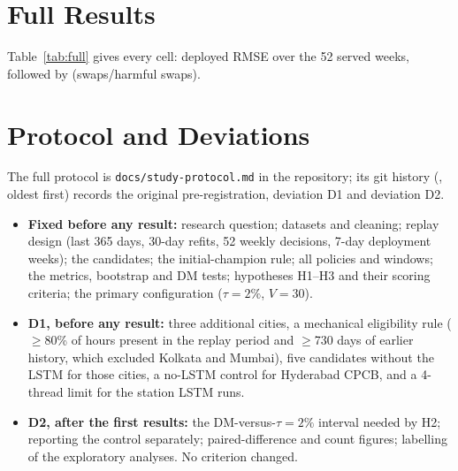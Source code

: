\documentclass[conference]{IEEEtran}
\newif\ifextended
\begin{document}
\ifextended
\appendices

\section{Full Results}
\label{app:full}
Table~\ref{tab:full} gives every cell: deployed RMSE over the 52 served weeks, followed by
(swaps/harmful swaps).



\section{Protocol and Deviations}
\label{app:protocol}
The full protocol is \texttt{docs/study-protocol.md} in the repository; its git history
(, oldest first) records the original pre-registration, deviation D1 and
deviation D2.
\begin{itemize}
  \item \textbf{Fixed before any result:} research question; datasets and cleaning; replay design
        (last 365 days, 30-day refits, 52 weekly decisions, 7-day deployment weeks); the
        candidates; the initial-champion rule; all policies and windows; the metrics, bootstrap and
        DM tests; hypotheses H1--H3 and their scoring criteria; the primary configuration
        (\(\tau=2\%\), \(V=30\)).
  \item \textbf{D1, before any result:} three additional cities, a mechanical eligibility rule
        (\(\ge\)80\% of hours present in the replay period and \(\ge\)730 days of earlier history,
        which excluded Kolkata and Mumbai), five candidates without the LSTM for those cities, a
        no-LSTM control for Hyderabad CPCB, and a 4-thread limit for the station LSTM runs.
  \item \textbf{D2, after the first results:} the DM-versus-\(\tau=2\%\) interval needed by H2;
        reporting the control separately; paired-difference and count figures; labelling of the
        exploratory analyses. No criterion changed.
\end{itemize}
\end{document}
